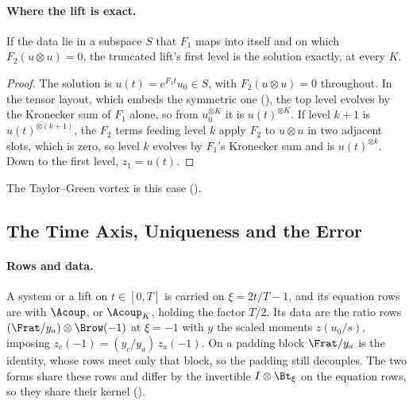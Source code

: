 \paragraph{Where the lift is exact.}
\begin{proposition}
\label{prop:exact-lift}
If the data lie in a subspace $S$ that $F_1$ maps into itself and on which $F_2(u\otimes u)=0$, the truncated lift's first level is the solution exactly, at every $K$.
\end{proposition}
\begin{proof}
The solution is $u(t)=e^{F_1t}u_0\in S$, with $F_2(u\otimes u)=0$ throughout. In the tensor layout, which embeds the symmetric one (), the top level evolves by the Kronecker sum of $F_1$ alone, so from $u_0^{\otimes K}$ it is $u(t)^{\otimes K}$. If level $k+1$ is $u(t)^{\otimes(k+1)}$, the $F_2$ terms feeding level $k$ apply $F_2$ to $u\otimes u$ in two adjacent slots, which is zero, so level $k$ evolves by $F_1$'s Kronecker sum and is $u(t)^{\otimes k}$. Down to the first level, $z_1=u(t)$.
\end{proof}
The Taylor--Green vortex is this case ().

\subsection{The Time Axis, Uniqueness and the Error}
\label{app:carleman-spacetime}

\paragraph{Rows and data.} A system or a lift on $t\in[0,T]$ is carried on $\xi=2t/T-1$, and its equation rows are  with $\Acoup$, or $\Acoup_K$, holding the factor $T/2$. Its data are the ratio rows $(\Frat/y_a)\otimes\Brow(-1)$ at $\xi=-1$ with $y$ the scaled moments $z(u_0/s)$, imposing $z_c(-1)=(y_c/y_a)\,z_a(-1)$. On a padding block $\Frat/y_a$ is the identity, whose rows meet only that block, so the padding still decouples. The two forms share these rows and differ by the invertible $I\otimes\Bt_\xi$ on the equation rows, so they share their kernel ().

